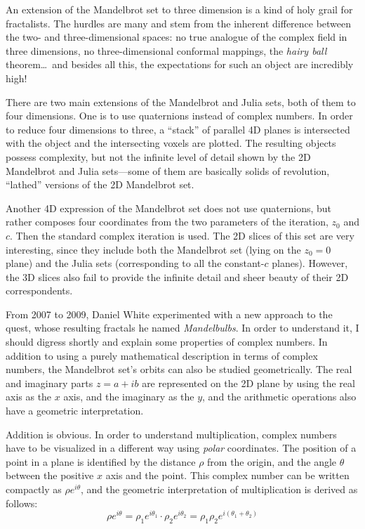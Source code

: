 \documentclass{article}
\begin{document}
An extension of the Mandelbrot set to three dimension is a kind of holy
grail for fractalists.  The hurdles are many and stem from the inherent
difference between the two- and three-dimensional spaces: no true analogue
of the complex field in three dimensions, no three-dimensional conformal
mappings, the \emph{hairy ball} theorem\dots\ and besides all this,
the expectations for such an object are incredibly high!

There are two main extensions of the Mandelbrot and Julia sets, both
of them to four dimensions.  One is to use quaternions instead of
complex numbers.  In order to reduce four dimensions to three, a
``stack'' of parallel 4D planes is intersected with the object and the
intersecting voxels are plotted.  The resulting objects possess
complexity, but not the infinite level of detail shown by the 2D
Mandelbrot and Julia sets---some of them are basically solids of
revolution, ``lathed'' versions of the 2D Mandelbrot set.

Another 4D expression of the Mandelbrot set does not use quaternions,
but rather composes four coordinates from the two parameters of
the iteration, $z_0$ and $c$.  Then the standard complex iteration
is used.  The 2D slices of this set are very interesting, since
they include both the Mandelbrot set (lying on the $z_0=0$ plane)
and the Julia sets (corresponding to all the constant-$c$ planes).
However, the 3D slices also fail to provide the infinite detail
and sheer beauty of their 2D correspondents.

From 2007 to 2009, Daniel White experimented with a new approach to
the quest, whose resulting fractals he named \emph{Mandelbulbs}.  In
order to understand it, I should digress shortly and explain some
properties of complex numbers.  In addition to using a purely
mathematical description in terms of complex numbers, the Mandelbrot
set's orbits can also be studied geometrically.  The real and
imaginary parts $z=a+ib$ are represented on the 2D plane by using the
real axis as the $x$ axis, and the imaginary as the $y$, and the
arithmetic operations also have a geometric interpretation.

Addition is obvious.  In order to understand multiplication, complex
numbers have to be visualized in a different way using \emph{polar}
coordinates.  The position of a point in a plane is identified by the
distance $\rho$ from the origin, and the angle $\theta$ between the
positive $x$ axis and the point.  This complex number can be written
compactly as $\rho e^{i \theta}$, and the geometric interpretation
of multiplication is derived as follows:
\begin{equation*}
  \rho e^{i \theta} =  \rho_1 e^{i \theta_1} \cdot \rho_2 e^{i \theta_2}
    = \rho_1\rho_2 e^{i (\theta_1 + \theta_2)}
\end{equation*}
  
\end{document}
